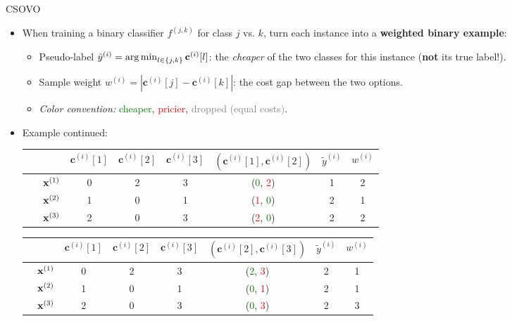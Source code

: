 \documentclass[11pt,compress,t,notes=noshow, xcolor=table]{beamer}
\newcommand{\cv}{\mathbf{c}}
\begin{document}
\begin{frame}{CSOVO}
    \begin{itemize}
        \item When training a binary classifier $f^{(j, k)}$ for class $j$ vs. $k$, turn each instance into a \textbf{weighted binary example}:
        \begin{itemize}
            \item Pseudo-label $\tilde{y}^{(i)} = \argmin_{l \in \{j, k\}} \cv^{(i)}[l]$: the \emph{cheaper} of the two classes for this instance (\textbf{not} its true label!).

            \item Sample weight $w^{(i)} = |\cv^{(i)}[j] - \cv^{(i)}[k]|$: the cost gap between the two options.

            \item \emph{Color convention:} \textcolor{green}{cheaper}, \textcolor{red}{pricier}, \textcolor{gray}{dropped (equal costs)}.
        \end{itemize}
        
        \item Example continued:
\begin{center}
    \footnotesize
                            \begin{tabular}{cc|ccc|ccc}\
        			& & $\cv^{(i)}[1]$ & $\cv^{(i)}[2]$ & $\cv^{(i)}[3]$ & $(\cv^{(i)}[1], \cv^{(i)}[2])$ & $\tilde{y}^{(i)}$ & $w^{(i)}$\\
        			\hline & $\mathbf{x}^{(1)}$ & 0 & 2 & 3 & (\textcolor{green}{0}, \textcolor{red}{2}) & 1 & 2\\
        			& $\mathbf{x}^{(2)}$ & 1 & 0 & 1 & (\textcolor{red}{1}, \textcolor{green}{0}) & 2 & 1 \\
                 	& $\mathbf{x}^{(3)}$ & 2 & 0 & 3 & (\textcolor{red}{2}, \textcolor{green}{0}) & 2 & 2\\
                \end{tabular}

                \begin{tabular}{cc|ccc|ccc}
        			& & $\cv^{(i)}[1]$ & $\cv^{(i)}[2]$ & $\cv^{(i)}[3]$ & $(\cv^{(i)}[2], \cv^{(i)}[3])$ & $\tilde{y}^{(i)}$ & $w^{(i)}$\\
        			\hline & $\mathbf{x}^{(1)}$ & 0 & 2 & 3 & (\textcolor{green}{2}, \textcolor{red}{3}) & 2 & 1\\
        			& $\mathbf{x}^{(2)}$ & 1 & 0 & 1 & (\textcolor{green}{0}, \textcolor{red}{1}) & 2 & 1\\
                 	& $\mathbf{x}^{(3)}$ & 2 & 0 & 3 & (\textcolor{green}{0}, \textcolor{red}{3}) & 2 & 3\\
                \end{tabular}
\end{center}

    \end{itemize}
\end{frame}
\end{document}
